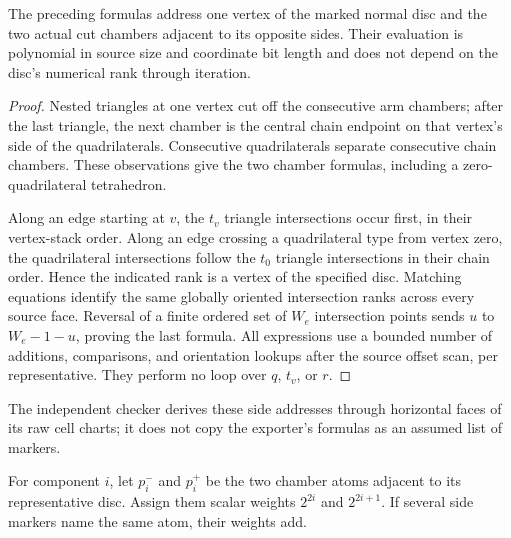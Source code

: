 \begin{lemma}
\label{lem:affine-markers}
The preceding formulas address one vertex of the marked normal disc
and the two actual cut chambers adjacent to its opposite sides.
Their evaluation is polynomial in source size and coordinate bit length
and does not depend on the disc's numerical rank through iteration.
\end{lemma}
\begin{proof}
Nested triangles at one vertex cut off the consecutive arm chambers;
after the last triangle, the next chamber is the central chain endpoint
on that vertex's side of the quadrilaterals. Consecutive quadrilaterals
separate consecutive chain chambers. These observations give the two
chamber formulas, including a zero-quadrilateral tetrahedron.

Along an edge starting at $v$, the $t_v$ triangle intersections occur
first, in their vertex-stack order. Along an edge crossing a quadrilateral
type from vertex zero, the quadrilateral intersections follow the
$t_0$ triangle intersections in their chain order. Hence the indicated
rank is a vertex of the specified disc. Matching equations identify the
same globally oriented intersection ranks across every source face.
Reversal of a finite ordered set of $W_e$ intersection points sends
$u$ to $W_e-1-u$, proving the last formula. All expressions use a bounded
number of additions, comparisons, and orientation lookups after the
source offset scan, per representative. They perform no loop over $q$,
$t_v$, or $r$.
\end{proof}

The independent checker derives these side addresses through horizontal
faces of its raw cell charts; it does not copy the exporter's formulas
as an assumed list of markers.

For component $i$, let $p_i^-$ and $p_i^+$ be the two chamber atoms adjacent
to its representative disc. Assign them scalar weights $2^{2i}$ and
$2^{2i+1}$. If several side markers name the same atom, their weights add.

